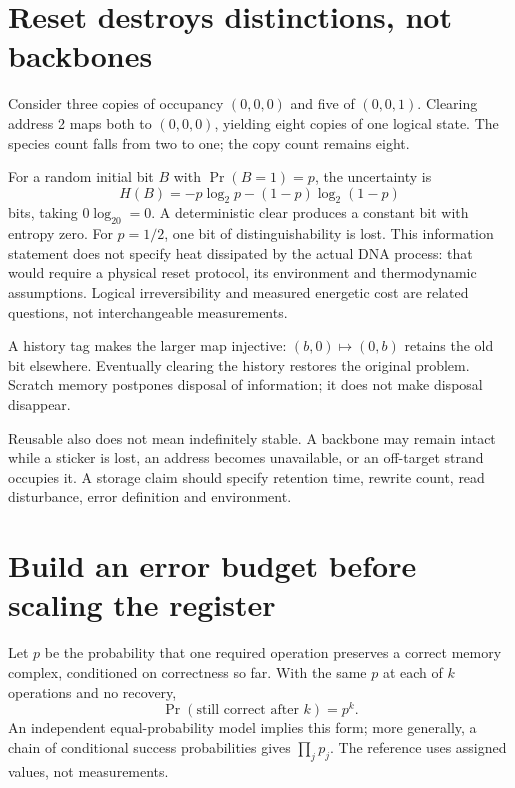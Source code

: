 \section{Reset destroys distinctions, not backbones}
Consider three copies of occupancy $(0,0,0)$ and five of $(0,0,1)$.
Clearing address 2 maps both to $(0,0,0)$, yielding eight copies of one
logical state. The species count falls from two to one; the copy count
remains eight.


For a random initial bit $B$ with $\Pr(B=1)=p$, the uncertainty is
\begin{equation}
 H(B)=-p\log_2p-(1-p)\log_2(1-p)
\end{equation}
bits, taking $0\log_20=0$. A deterministic clear produces a constant bit
with entropy zero. For $p=1/2$, one bit of distinguishability is lost.
This information statement does not specify heat dissipated by the actual
DNA process: that would require a physical reset protocol, its environment
and thermodynamic assumptions. Logical irreversibility and measured
energetic cost are related questions, not interchangeable measurements.

A history tag makes the larger map injective: $(b,0)\mapsto(0,b)$ retains
the old bit elsewhere. Eventually clearing the history restores the
original problem. Scratch memory postpones disposal of information; it
does not make disposal disappear.

Reusable also does not mean indefinitely stable. A backbone may remain
intact while a sticker is lost, an address becomes unavailable, or an
off-target strand occupies it. A storage claim should specify retention
time, rewrite count, read disturbance, error definition and environment.

\section{Build an error budget before scaling the register}
Let $p$ be the probability that one required operation preserves a correct
memory complex, conditioned on correctness so far. With the same $p$
at each of $k$ operations and no recovery,
\begin{equation}
 \Pr(\text{still correct after }k)=p^k.
 \label{eq:retention}
\end{equation}
An independent equal-probability model implies this form; more generally,
a chain of conditional success probabilities gives $\prod_jp_j$.
The reference uses assigned values, not measurements.

